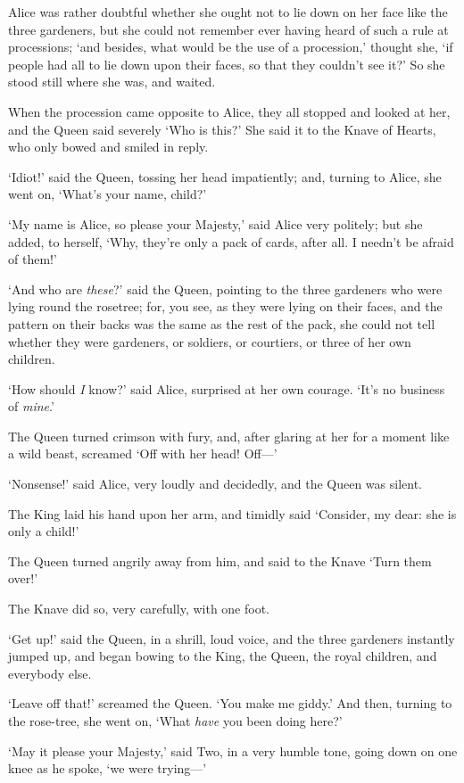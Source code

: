 \documentclass[12pt,openany]{memoir}
\begin{document}
Alice was rather doubtful whether she ought not to lie down on her face like the three gardeners, but she could not remember ever having heard of such a rule at processions; `and besides, what would be the use of a procession,' thought she, `if people had all to lie down upon their faces, so that they couldn't see it?' So she stood still where she was, and waited.

When the procession came opposite to Alice, they all stopped and looked at her, and the Queen said severely `Who is this?' She said it to the Knave of Hearts, who only bowed and smiled in reply.

`Idiot!' said the Queen, tossing her head impatiently; and, turning to Alice, she went on, `What's your name, child?'

`My name is Alice, so please your Majesty,' said Alice very politely; but she added, to herself, `Why, they're only a pack of cards, after all. I needn't be afraid of them!'

`And who are \textit{these}?' said the Queen, pointing to the three gardeners who were lying round the rosetree; for, you see, as they were lying on their faces, and the pattern on their backs was the same as the rest of the pack, she could not tell whether they were gardeners, or soldiers, or courtiers, or three of her own children.

`How should \textit{I} know?' said Alice, surprised at her own courage. `It's no business of \textit{mine}.'

The Queen turned crimson with fury, and, after glaring at her for a moment like a wild beast, screamed `Off with her head! Off---'

`Nonsense!' said Alice, very loudly and decidedly, and the Queen was silent.

The King laid his hand upon her arm, and timidly said `Consider, my dear: she is only a child!'

The Queen turned angrily away from him, and said to the Knave `Turn them over!'

The Knave did so, very carefully, with one foot.

`Get up!' said the Queen, in a shrill, loud voice, and the three gardeners instantly jumped up, and began bowing to the King, the Queen, the royal children, and everybody else.

`Leave off that!' screamed the Queen. `You make me giddy.' And then, turning to the rose-tree, she went on, `What \textit{have} you been doing here?'

`May it please your Majesty,' said Two, in a very humble tone, going down on one knee as he spoke, `we were trying---'
\end{document}
